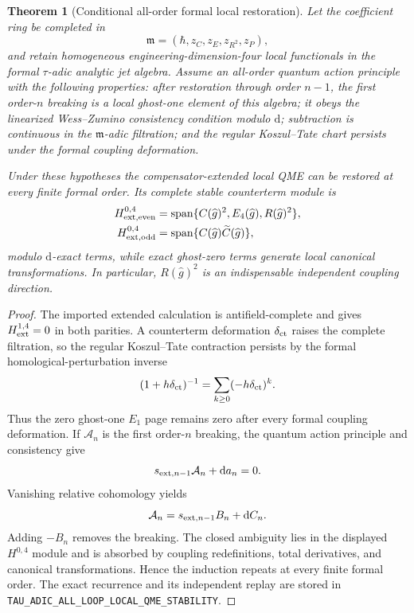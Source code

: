 \documentclass[11pt]{article}
\newtheorem{theorem}{Theorem}[section]
\theoremstyle{definition}
\theoremstyle{remark}
\newcommand{\cA}{\mathcal A}
\newcommand{\ghat}{\widehat g}
\newcommand{\dd}{\mathrm d}
\begin{document}
\begin{theorem}[Conditional all-order formal local restoration]
Let the coefficient ring be completed in
\[
 \mathfrak m=(\hbar,z_C,z_E,z_{R^2},z_P),
\]
and retain homogeneous engineering-dimension-four local functionals in the
formal $\tau$-adic analytic jet algebra.  Assume an all-order quantum action
principle with the following properties: after restoration through order
$n-1$, the first order-$n$ breaking is a local ghost-one element of this
algebra; it obeys the linearized Wess--Zumino consistency condition modulo
$\dd$; subtraction is continuous in the $\mathfrak m$-adic filtration; and
the regular Koszul--Tate chart persists under the formal coupling
deformation.

Under these hypotheses the compensator-extended local QME can be restored at
every finite formal order.  Its complete stable counterterm module is
\[
 \begin{split}
 H^{0,4}_{\rm ext,even}
   &=\operatorname{span}\{C(\ghat)^2,E_4(\ghat),R(\ghat)^2\},\\
 H^{0,4}_{\rm ext,odd}
   &=\operatorname{span}\{C(\ghat)\widetilde C(\ghat)\},
 \end{split}
\]
modulo $\dd$-exact terms, while exact ghost-zero terms generate local
canonical transformations.  In particular, $R(\ghat)^2$ is an indispensable
independent coupling direction.
\end{theorem}

\begin{proof}
The imported extended calculation is antifield-complete and gives
$H^{1,4}_{\rm ext}=0$ in both parities.  A counterterm deformation
$\delta_{\rm ct}$ raises the complete filtration, so the regular
Koszul--Tate contraction persists by the formal homological-perturbation
inverse
\[
 (1+h\delta_{\rm ct})^{-1}
   =\sum_{k\geq0}(-h\delta_{\rm ct})^k .
\]
Thus the zero ghost-one $E_1$ page remains zero after every formal coupling
deformation.  If $\cA_n$ is the first order-$n$ breaking, the quantum action
principle and consistency give
\[
 s_{{\rm ext},n-1}\cA_n+\dd a_n=0.
\]
Vanishing relative cohomology yields
\[
 \cA_n=s_{{\rm ext},n-1}B_n+\dd C_n.
\]
Adding $-B_n$ removes the breaking.  The closed ambiguity lies in the
displayed $H^{0,4}$ module and is absorbed by coupling redefinitions, total
derivatives, and canonical transformations.  Hence the induction repeats at
every finite formal order.  The exact recurrence and its independent replay
are stored in
\texttt{TAU\_ADIC\_ALL\_LOOP\_LOCAL\_QME\_STABILITY}.
\end{proof}
\end{document}
